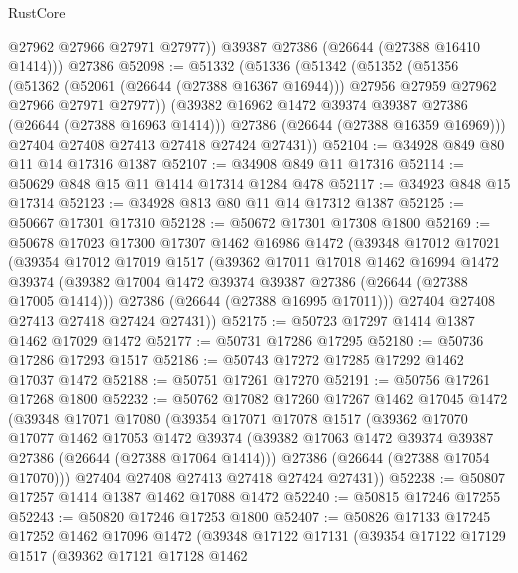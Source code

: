 \begin{lexlean}{RustCore}
\begin{coremodule}
          @27962
          @27966
          @27971
          @27977))
      @39387
      @27386
      (@26644 (@27388 @16410 @1414)))
    @27386
@52098 := @51332
    (@51336
      (@51342
        (@51352
          (@51356
            (@51362
              (@52061 (@26644 (@27388 @16367 @16944)))
              @27956
              @27959
              @27962
              @27966
              @27971
              @27977))
          (@39382 @16962 @1472 @39374 @39387 @27386 (@26644 (@27388 @16963 @1414)))
          @27386
          (@26644 (@27388 @16359 @16969)))
        @27404
        @27408
        @27413
        @27418
        @27424
        @27431))
@52104 := @34928 @849 @80 @11 @14 @17316 @1387
@52107 := @34908 @849 @11 @17316
@52114 := @50629 @848 @15 @11 @1414 @17314 @1284 @478
@52117 := @34923 @848 @15 @17314
@52123 := @34928 @813 @80 @11 @14 @17312 @1387
@52125 := @50667 @17301 @17310
@52128 := @50672 @17301 @17308 @1800
@52169 := @50678
    @17023
    @17300
    @17307
    @1462
    @16986
    @1472
    (@39348
      @17012
      @17021
      (@39354
        @17012
        @17019
        @1517
        (@39362
          @17011
          @17018
          @1462
          @16994
          @1472
          @39374
          (@39382 @17004 @1472 @39374 @39387 @27386 (@26644 (@27388 @17005 @1414)))
          @27386
          (@26644 (@27388 @16995 @17011)))
        @27404
        @27408
        @27413
        @27418
        @27424
        @27431))
@52175 := @50723 @17297 @1414 @1387 @1462 @17029 @1472
@52177 := @50731 @17286 @17295
@52180 := @50736 @17286 @17293 @1517
@52186 := @50743 @17272 @17285 @17292 @1462 @17037 @1472
@52188 := @50751 @17261 @17270
@52191 := @50756 @17261 @17268 @1800
@52232 := @50762
    @17082
    @17260
    @17267
    @1462
    @17045
    @1472
    (@39348
      @17071
      @17080
      (@39354
        @17071
        @17078
        @1517
        (@39362
          @17070
          @17077
          @1462
          @17053
          @1472
          @39374
          (@39382 @17063 @1472 @39374 @39387 @27386 (@26644 (@27388 @17064 @1414)))
          @27386
          (@26644 (@27388 @17054 @17070)))
        @27404
        @27408
        @27413
        @27418
        @27424
        @27431))
@52238 := @50807 @17257 @1414 @1387 @1462 @17088 @1472
@52240 := @50815 @17246 @17255
@52243 := @50820 @17246 @17253 @1800
@52407 := @50826
    @17133
    @17245
    @17252
    @1462
    @17096
    @1472
    (@39348
      @17122
      @17131
      (@39354
        @17122
        @17129
        @1517
        (@39362
          @17121
          @17128
          @1462

\end{coremodule}
\end{lexlean}
